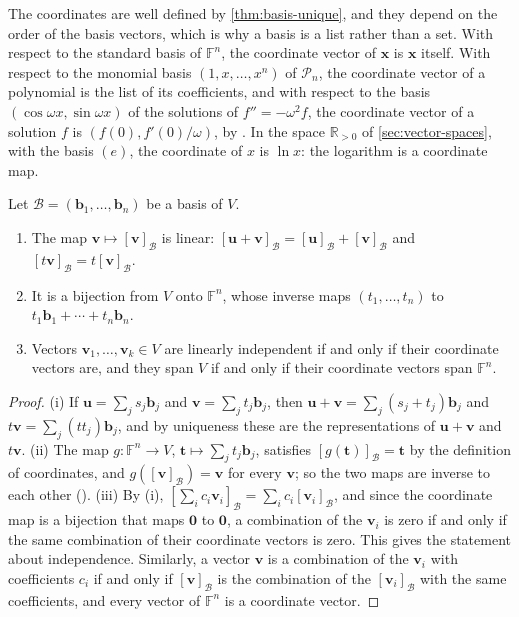 The coordinates are well defined by \cref{thm:basis-unique}, and they depend on the order of the basis vectors, which is why a basis is a list rather than a set. With respect to the standard basis of $\mathbb F^n$, the coordinate vector of $\mathbf x$ is $\mathbf x$ itself. With respect to the monomial basis $(1,x,\ldots,x^n)$ of $\mathcal P_n$, the coordinate vector of a polynomial is the list of its coefficients, and with respect to the basis $(\cos\omega x,\sin\omega x)$ of the solutions of $f''=-\omega^2f$, the coordinate vector of a solution $f$ is $(f(0),f'(0)/\omega)$, by . In the space $\mathbb R_{>0}$ of \cref{sec:vector-spaces}, with the basis $(e)$, the coordinate of $x$ is $\ln x$: the logarithm is a coordinate map.

\begin{theorem}
\label{thm:coordinate-map}
Let $\mathcal B=(\mathbf b_1,\ldots,\mathbf b_n)$ be a basis of $V$.
\begin{enumerate}
\item The map $\mathbf v\mapsto[\mathbf v]_{\mathcal B}$ is linear: $[\mathbf u+\mathbf v]_{\mathcal B}=[\mathbf u]_{\mathcal B}+[\mathbf v]_{\mathcal B}$ and $[t\mathbf v]_{\mathcal B}=t[\mathbf v]_{\mathcal B}$.
\item It is a bijection from $V$ onto $\mathbb F^n$, whose inverse maps $(t_1,\ldots,t_n)$ to $t_1\mathbf b_1+\cdots+t_n\mathbf b_n$.
\item Vectors $\mathbf v_1,\ldots,\mathbf v_k\in V$ are linearly independent if and only if their coordinate vectors are, and they span $V$ if and only if their coordinate vectors span $\mathbb F^n$.
\end{enumerate}
\end{theorem}

\begin{proof}
(i) If $\mathbf u=\sum_js_j\mathbf b_j$ and $\mathbf v=\sum_jt_j\mathbf b_j$, then $\mathbf u+\mathbf v=\sum_j(s_j+t_j)\mathbf b_j$ and $t\mathbf v=\sum_j(tt_j)\mathbf b_j$, and by uniqueness these are the representations of $\mathbf u+\mathbf v$ and $t\mathbf v$. (ii) The map $g\colon\mathbb F^n\to V$, $\mathbf t\mapsto\sum_jt_j\mathbf b_j$, satisfies $[g(\mathbf t)]_{\mathcal B}=\mathbf t$ by the definition of coordinates, and $g([\mathbf v]_{\mathcal B})=\mathbf v$ for every $\mathbf v$; so the two maps are inverse to each other (). (iii) By (i), $[\sum_ic_i\mathbf v_i]_{\mathcal B}=\sum_ic_i[\mathbf v_i]_{\mathcal B}$, and since the coordinate map is a bijection that maps $\mathbf 0$ to $\mathbf 0$, a combination of the $\mathbf v_i$ is zero if and only if the same combination of their coordinate vectors is zero. This gives the statement about independence. Similarly, a vector $\mathbf v$ is a combination of the $\mathbf v_i$ with coefficients $c_i$ if and only if $[\mathbf v]_{\mathcal B}$ is the combination of the $[\mathbf v_i]_{\mathcal B}$ with the same coefficients, and every vector of $\mathbb F^n$ is a coordinate vector.
\end{proof}

